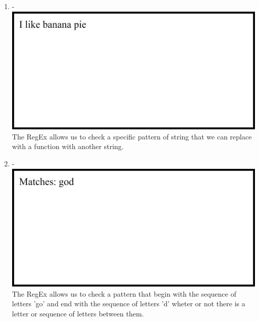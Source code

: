 \documentclass[12pt,titlepage]{article}
\begin{document}
\begin{enumerate}
\begin{enumerate}
        \item - \\ \includegraphics[width=.85\textwidth]{images/figures/fig5.3.png} \\ The RegEx allows us to check a specific pattern of string that we can replace with a function with another string.
        \item - \\ \includegraphics[width=.85\textwidth]{images/figures/fig5.4.png} \\ The RegEx allows us to check a pattern that begin with the sequence of letters 'go' and end with the sequence of letters 'd' wheter or not there is a letter or sequence of letters between them.
        
        \newpage


\end{enumerate}
\end{enumerate}
\end{document}
